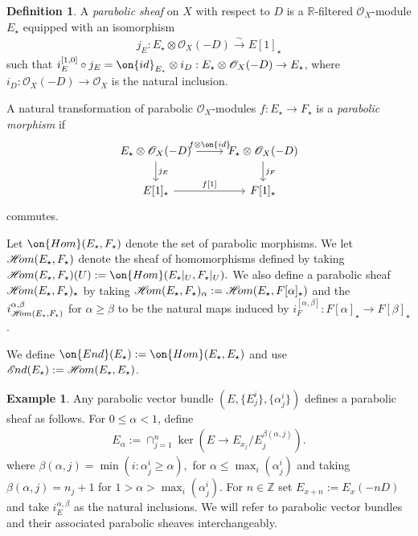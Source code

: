 \documentclass[12 pt]{amsart}
\theoremstyle{plain}
\theoremstyle{definition}
\newtheorem{definition}[subsubsection]{Definition}
\newtheorem{example}[subsubsection]{Example}
\theoremstyle{remark}
\numberwithin{equation}{section}
\newcommand*{\sheafhom}{\mathscr{H}\kern -2pt om}
\newcommand*{\sheafend}{\mathscr{E}\kern -1pt nd}
\begin{document}
\begin{definition}
	\label{definition:parabolic-sheaf}
A {\em parabolic sheaf} on $X$ with respect to $D$ is
a $\mathbb R$-filtered $\mathscr O_X$-module $E_\star$ equipped with an isomorphism
\begin{align*}
	j_E : E_\star \otimes \mathscr O_X(-D) \overset{\sim}{\to} E[1]_\star
\end{align*}
 such that $i_E^{[1,0]} \circ j_E = \on{id}_{E_\star}
\otimes i_D: E_\star \otimes \mathscr O_X(-D) \to E_\star$, where $i_D: \mathscr{O}_X(-D)\to \mathscr{O}_X$ is the natural inclusion.

A natural transformation of parabolic $\mathscr O_X$-modules $f: E_\star \to
F_\star$ is a {\em parabolic morphism} if
\begin{equation}
	\label{equation:}
	\begin{tikzcd} 
		E_\star \otimes \mathscr O_X(-D) \ar {r}{f\otimes
		\on{id}} \ar {d}{j_E} & F_\star \otimes \mathscr
		O_X(-D) \ar {d}{j_F} \\
		E[1]_\star \ar {r}{f[1]} & F[1]_\star
\end{tikzcd}\end{equation}
commutes.

Let $\on{Hom}(E_\star, F_\star)$ denote the set of parabolic morphisms.
We let $\sheafhom(E_\star, F_\star)$ denote the sheaf of homomorphisms 
defined by taking $\sheafhom(E_\star, F_\star)(U):= \on{Hom}(E_\star|_U,
F_\star|_U).$
We also define a parabolic sheaf
$\sheafhom(E_\star, F_\star)_\star$ by taking
$\sheafhom(E_\star, F_\star)_\alpha := \sheafhom(E_\star, F[\alpha]_\star)$
and the $i_{\sheafhom(E_\star, F_\star)}^{\alpha,\beta}$ for $\alpha \geq \beta$
to be the natural maps
induced by $i_F^{[\alpha, \beta]}: F[\alpha]_\star \to F[\beta]_\star$.

We define $\on{End}(E_\star) := \on{Hom}(E_\star, E_\star)$
and use $\sheafend(E_\star) := \sheafhom(E_\star, E_\star)$.
\end{definition}



\begin{example}
	\label{example:parabolic}
	Any parabolic vector bundle $(E, \{E^i_j\}, \{\alpha^i_j\})$ defines a
	parabolic sheaf as follows. For $0 \leq \alpha < 1$,
	define
	\begin{align*}
	E_\alpha := \cap_{j=1}^n \ker(E \to
	E_{x_j}/E^{\beta(\alpha, j)}_j).
	\end{align*}
	where $\beta(\alpha, j)=\min(i: \alpha^i_j\geq \alpha),$ for $\alpha\leq \max_i(\alpha^i_j)$ and taking $\beta(\alpha, j)=n_j+1$ for $1>\alpha>\max_i(\alpha^i_j)$.
	For $n\in \mathbb{Z}$ set $E_{x+n} := E_x(-nD)$ and take $i^{\alpha,\beta}_E$ as the
	natural inclusions. We will refer to parabolic vector bundles and their associated parabolic sheaves interchangeably.
\end{example}
\end{document}
